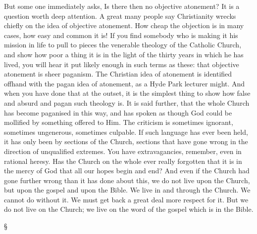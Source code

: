 \documentclass[12pt,a5paper,twoside,titlepage]{book}
\begin{document}
But some one immediately asks, Is there then 
no objective atonement? It is a question worth 
deep attention. A great many people say 
Christianity wrecks chiefly on the idea of objective 
atonement. How cheap the objection is 
in many cases, how easy and common it is! If 
you find somebody who is making it his mission 
in life to pull to pieces the venerable theology of 
the Catholic Church, and show how poor a thing 
it is in the light of the thirty years in which he 
has lived, you will hear it put likely enough in 
such terms as these: that objective atonement is 
sheer paganism. The Christian idea of atonement 
is identified offhand with the pagan idea 
of atonement, as a Hyde Park lecturer might. 
And when you have done that at the outset, it 
is the simplest thing to show how false and 
absurd and pagan such theology is. It is said 
further, that the whole Church has become 
paganised in this way, and has spoken as though 
God could be mollified by something offered to 
Him. The criticism is sometimes ignorant, 
sometimes ungenerous, sometimes culpable. If 
such language has ever been held, it has only 
been by sections of the Church, sections that 
have gone wrong in the direction of unqualified 
extremes. You have extravagancies, remember, 
even in rational heresy. Has the Church on 
the whole ever really forgotten that it is in 
the mercy of God that all our hopes begin and 
end? And even if the Church had gone further 
wrong than it has done about this, we do not 
live upon the Church, but upon the gospel and 
upon the Bible. We live in and through the 
Church. We cannot do without it. We must 
get back a great deal more respect for it. But 
we do not live on the Church; we live on the 
word of the gospel which is in the Bible. 

\begin{center}
\S
\end{center}
\end{document}
